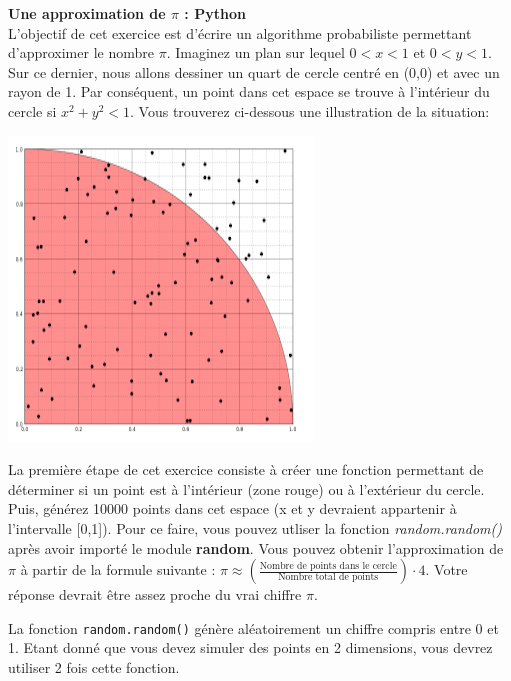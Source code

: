 \begin{Exercice}[15 minutes]\textbf{Une approximation de $\pi$ : Python}\\
    L'objectif de cet exercice est d'écrire un algorithme probabiliste permettant d'approximer le nombre $\pi$. Imaginez un plan sur lequel $0 < x < 1$ et $0 < y < 1$. Sur ce dernier, nous allons dessiner un quart de cercle centré en (0,0) et avec un rayon de 1. Par conséquent, un point dans cet espace se trouve à l'intérieur du cercle si $x^2 + y^2 < 1$. Vous trouverez ci-dessous une illustration de la situation:
    \begin{center}
    \includegraphics[]{resources/Cercle.PNG}
    \end{center}
    La première étape de cet exercice consiste à créer une fonction permettant de déterminer si un point est à l'intérieur (zone rouge) ou à l'extérieur du cercle. Puis, générez 10000 points dans cet espace (x et y devraient appartenir à l'intervalle [0,1]). Pour ce faire, vous pouvez utliser la fonction \textit{random.random()} après avoir importé le module \textbf{random}. Vous pouvez obtenir l'approximation de $\pi$ à partir de la formule suivante : $\pi \approx (\frac{\text{Nombre de points dans le cercle}}{\text{Nombre total de points}})\cdot 4$. Votre réponse devrait être assez proche du vrai chiffre $\pi$.\\
    \begin{conseil}
        La fonction \lstinline{random.random()} génère aléatoirement un chiffre compris entre 0 et 1. Etant donné que vous devez simuler des points en 2 dimensions, vous devrez utiliser 2 fois cette fonction.
    \end{conseil}
    \begin{solution}
        
    \end{solution}
    
\end{Exercice}
\newpage
